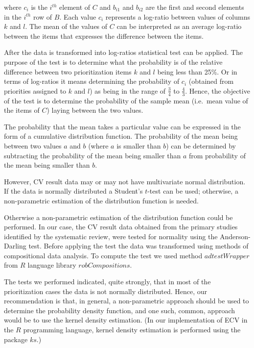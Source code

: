 where $c_{i}$ is the $i^{th}$ element of $C$ and $b_{i1}$ and $b_{i2}$ are the first and second elements in the $i^{th}$ row of $B$.
Each value $c_{i}$ represents a log-ratio between values of columns $k$ and $l$.
The mean of the values of $C$ can be interpreted as an average log-ratio between the items that expresses the difference between the items.

After the data is transformed into log-ratios statistical test can be applied.
The purpose of the test is to determine what the probability is of the relative difference between two prioritization items $k$ and $l$ being less than 25\%.
Or in terms of log-ratios it means determining the probability of $c_{i}$ (obtained from priorities assigned to $k$ and $l$) as being in the range of $\frac{3}{4}$ to $\frac{4}{3}$.
Hence, the objective of the test is to determine the probability of the sample mean (i.e.\ mean value of the items of $C$) laying between the two values.

The probability that the mean takes a particular value can be expressed in the form of a cumulative distribution function.
The probability of the mean being between two values $a$ and $b$ (where $a$ is smaller than $b$) can be determined by subtracting the probability of the mean being smaller than $a$ from probability of the mean being smaller than $b$.

However, CV result data may or may not have multivariate normal distribution.
If the data is normally distributed a Student's $t$-test can be used; otherwise, a non-parametric estimation of the distribution function is needed.

Otherwise a non-parametric estimation of the distribution function could be performed.
In our case, the CV result data obtained from the primary studies identified by the systematic review, were tested for normality using the Anderson-Darling test.
Before applying the test the data was transformed using methods of compositional data analysis.
To compute the test we used method $adtestWrapper$ from $R$ language library $robCompositions$.

The tests we performed indicated, quite strongly, that in most of the prioritization cases the data is not normally distributed.
Hence, our recommendation is that, in general, a non-parametric approach should be used to determine the probability density function, and one such, common, approach would be to use the kernel density estimation.
(In our implementation of ECV in the $R$ programming language, kernel density estimation is performed using the package $ks$.)

